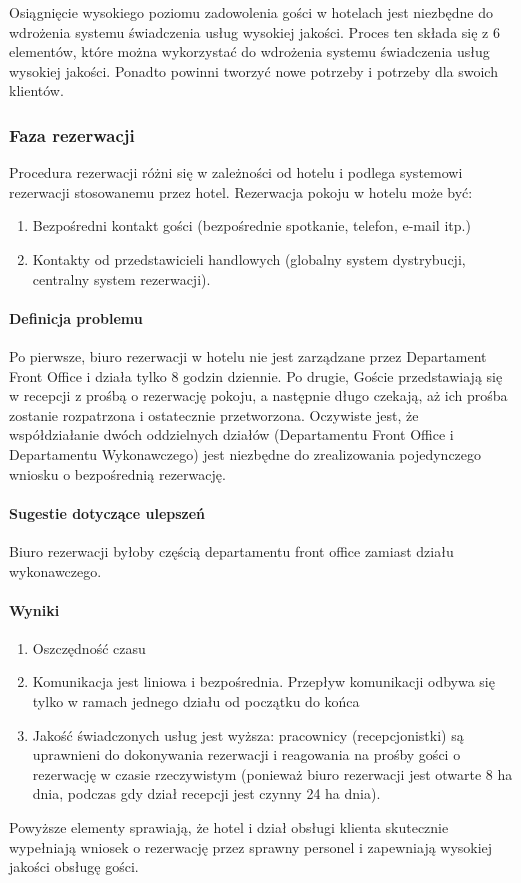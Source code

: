 \documentclass[a4paper, 12pt]{article}
\begin{document}
Osiągnięcie wysokiego poziomu zadowolenia gości w hotelach jest niezbędne do wdrożenia systemu świadczenia usług wysokiej jakości. Proces ten składa się z 6 elementów, które można wykorzystać do wdrożenia systemu świadczenia usług wysokiej jakości. Ponadto powinni tworzyć nowe potrzeby i potrzeby dla swoich klientów.
\subsubsection{Faza rezerwacji}
Procedura rezerwacji różni się w zależności od hotelu i podlega systemowi rezerwacji stosowanemu przez hotel. Rezerwacja pokoju w hotelu może być:
\begin{enumerate}
	\item Bezpośredni kontakt gości (bezpośrednie spotkanie, telefon, e-mail itp.)
	\item Kontakty od przedstawicieli handlowych (globalny system dystrybucji, centralny system rezerwacji).
\end{enumerate}
\paragraph{Definicja problemu}
Po pierwsze, biuro rezerwacji w hotelu nie jest zarządzane przez Departament Front Office i działa tylko 8 godzin dziennie. Po drugie, Goście przedstawiają się w recepcji z prośbą o rezerwację pokoju, a następnie długo czekają, aż ich prośba zostanie rozpatrzona i ostatecznie przetworzona. Oczywiste jest, że współdziałanie dwóch oddzielnych działów (Departamentu Front Office i Departamentu Wykonawczego) jest niezbędne do zrealizowania pojedynczego wniosku o bezpośrednią rezerwację.
\paragraph{Sugestie dotyczące ulepszeń}
Biuro rezerwacji byłoby częścią departamentu front office zamiast działu wykonawczego.
\paragraph{Wyniki}
\begin{enumerate}
	\item Oszczędność czasu
	\item Komunikacja jest liniowa i bezpośrednia. Przepływ komunikacji odbywa się tylko w ramach jednego działu od początku do końca
	\item Jakość świadczonych usług jest wyższa: pracownicy (recepcjonistki) są uprawnieni do dokonywania rezerwacji i reagowania na prośby gości o rezerwację w czasie rzeczywistym (ponieważ biuro rezerwacji jest otwarte 8 ha dnia, podczas gdy dział recepcji jest czynny 24 ha dnia).
\end{enumerate}
\hspace{1cm} Powyższe elementy sprawiają, że hotel i dział obsługi klienta skutecznie wypełniają wniosek o rezerwację przez sprawny personel i zapewniają wysokiej jakości obsługę gości.
\end{document}
